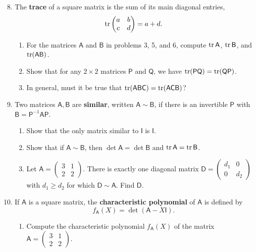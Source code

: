 \begin{enumerate}\setcounter{enumi}{7}
\item The \textbf{trace} of a square matrix is the sum of its main diagonal entries,
\begin{equation*}
\operatorname{tr}\begin{pmatrix} a & b \\ c & d \end{pmatrix} = a + d.
\end{equation*}
\begin{enumerate}
\item For the matrices $\mathsf{A}$ and $\mathsf{B}$ in problems 3, 5, and 6, compute $\operatorname{tr}\mathsf{A}$, $\operatorname{tr}\mathsf{B}$, and $\operatorname{tr}(\mathsf{AB})$.
\item Show that for any $2\times 2$ matrices $\mathsf{P}$ and $\mathsf{Q}$, we have $\operatorname{tr}(\mathsf{PQ}) = \operatorname{tr}(\mathsf{QP})$.
\item In general, must it be true that $\operatorname{tr}(\mathsf{ABC}) = \operatorname{tr}(\mathsf{ACB})$?
\end{enumerate}
\item Two matrices $\mathsf{A},\mathsf{B}$ are \textbf{similar}, written $\mathsf{A}\sim\mathsf{B}$, if there is an invertible $\mathsf{P}$ with $\mathsf{B} = \mathsf{P}^{-1}\mathsf{AP}$.
\begin{enumerate}
\item Show that the only matrix similar to $\mathsf{I}$ is $\mathsf{I}$.
\item Show that if $\mathsf{A}\sim\mathsf{B}$, then $\det\mathsf{A} = \det\mathsf{B}$ and $\operatorname{tr}\mathsf{A} = \operatorname{tr}\mathsf{B}$.
\item Let $\mathsf{A} = \begin{pmatrix} 3 & 1 \\ 2 & 2 \end{pmatrix}$. There is exactly one diagonal matrix $\mathsf{D} = \begin{pmatrix} d_1 & 0 \\ 0 & d_2 \end{pmatrix}$ with $d_1\geq d_2$ for which $\mathsf{D}\sim\mathsf{A}$. Find $\mathsf{D}$.
\end{enumerate}
\item If $\mathsf{A}$ is a square matrix, the \textbf{characteristic polynomial} of $\mathsf{A}$ is defined by
\begin{equation*}
f_{\mathsf{A}}(X) = \det(\mathsf{A} - X\mathsf{I}).
\end{equation*}
\begin{enumerate}
\item Compute the characteristic polynomial $f_{\mathsf{A}}(X)$ of the matrix $\mathsf{A} = \begin{pmatrix} 3 & 1 \\ 2 & 2 \end{pmatrix}$.

\end{enumerate}
\end{enumerate}
